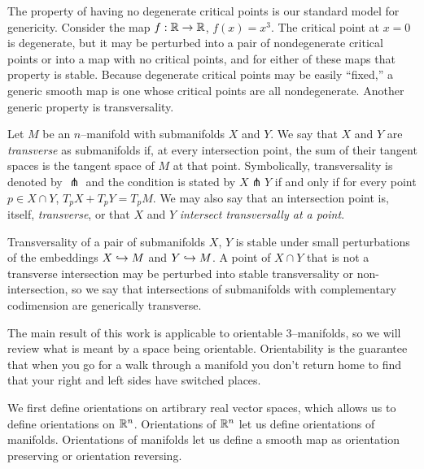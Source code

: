 The property of having no degenerate critical points is our standard model for genericity.
Consider the map $f:\mathbb{R}\to\mathbb{R}$, $f(x)=x^3$.
The critical point at $x=0$ is degenerate, but it may be perturbed into a pair of nondegenerate critical points or into a map with no critical points, and for either of these maps that property is stable.
Because degenerate critical points may be easily ``fixed,'' a generic smooth map is one whose critical points are all nondegenerate.
Another generic property is transversality.

\begin{defn}
	Let $M$ be an $n$--manifold with submanifolds $X$ and $Y$.
	We say that $X$ and $Y$ are \emph{transverse} as submanifolds if, at every intersection point, the sum of their tangent spaces is the tangent space of $M$ at that point.
	Symbolically, transversality is denoted by $\pitchfork$ and the condition is stated by $X\pitchfork Y$ if and only if for every point $p\in X\cap Y$, $T_p X+ T_p Y=T_p M$.
	We may also say that an intersection point is, itself, \emph{transverse}, or that $X$ and $Y$ \emph{intersect transversally at a point}.	
\end{defn}

Transversality of a pair of submanifolds $X$, $Y$ is stable under small perturbations of the embeddings $X\hookrightarrow M$ and $Y\hookrightarrow M$.
A point of $X\cap Y$ that is not a transverse intersection may be perturbed into stable transversality or non-intersection, so we say that intersections of submanifolds with complementary codimension are generically transverse.

The main result of this work is applicable to orientable 3--manifolds, so we will review what is meant by a space being orientable.
Orientability is the guarantee that when you go for a walk through a manifold you don't return home to find that your right and left sides have switched places.

We first define orientations on artibrary real vector spaces, which allows us to define orientations on $\mathbb{R}^n$.
Orientations of $\mathbb{R}^n$ let us define orientations of manifolds.
Orientations of manifolds let us define a smooth map as orientation preserving or orientation reversing.


